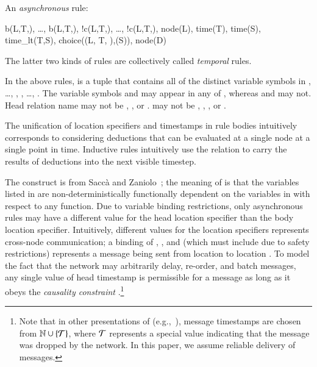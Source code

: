 An {\em asynchronous} rule:

\begin{Drules}
        {b(L,T,), \ldots, b(L,T,),
          !c(L,T,), \ldots, !c(L,T,),
          node(L), time(T), time(S), time_lt(T,S), choice((L, T, ),(S)), node(D)}
\end{Drules}

The latter two kinds of rules are collectively called {\em temporal} rules.

In the above rules,  is a tuple that contains all of the distinct variable
symbols in , \ldots, , , \ldots,
.  The variable symbols  and  may appear in
any of , whereas  and  may not.
Head relation name  may not be , , or .
 may not be
, , , or \dedalus{<}.

The unification of location specifiers and timestamps in rule bodies intuitively corresponds to considering deductions that can be evaluated at a single node at a single point in time.  Inductive rules intuitively use the  relation to carry the results of deductions into the next visible timestep.

The  construct is from Sacc\`{a} and Zaniolo~\cite{sacca-zaniolo};
the meaning of  is that the variables listed
in  are non-deterministically functionally dependent on the variables in  with respect to
any function.  Due to variable binding restrictions, only asynchronous rules may
have a different value for the head location specifier than the body location
specifier.  Intuitively, different values for the location specifiers represents
cross-node communication; a binding of , , and 
(which must include  due to safety restrictions) represents a message
being sent from location  to location .  To model the fact
that the network may arbitrarily delay, re-order, and batch messages, any single
value of head timestamp  is permissible for a message as long as it
obeys the {\em causality constraint} .\footnote{Note that in
  other presentations of \lang (e.g.,~\cite{dedalus}), message timestamps are
  chosen from $\mathbb{N} \cup \{\mathcal{T}\}$, where $\mathcal{T}$ represents a special value
  indicating that the message was dropped by the network. In this paper, we
  assume reliable delivery of messages.}

